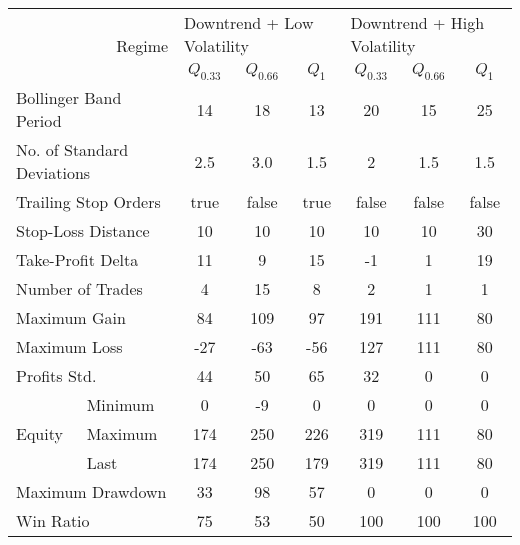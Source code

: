 \centering
\begin{tabular}{ll|cccccc}
    \toprule
    \multicolumn{2}{r|}{\multirow{2}{*}{Regime}} & \multicolumn{3}{l}{Downtrend + Low Volatility}   & \multicolumn{3}{l}{Downtrend + High Volatility}   \\
    \multicolumn{2}{r|}{} & $Q_{0.33}$ & $Q_{0.66}$ & $Q_{1}$ & $Q_{0.33}$ & $Q_{0.66}$ & $Q_{1}$ \\
    \midrule
    \multicolumn{2}{l|}{Bollinger Band Period} & 14 & 18 & 13 & 20 & 15 & 25 \\
    \multicolumn{2}{l|}{No. of Standard Deviations} & 2.5 & 3.0 & 1.5 & 2 & 1.5 & 1.5 \\
    \multicolumn{2}{l|}{Trailing Stop Orders} & true & false & true & false & false & false \\
    \multicolumn{2}{l|}{Stop-Loss Distance} & 10 & 10 & 10 & 10 & 10 & 30 \\
    \multicolumn{2}{l|}{Take-Profit Delta} & 11 & 9 & 15 & -1 & 1 & 19 \\
    \midrule
    \multicolumn{2}{l|}{Number of Trades} & 4 & 15 & 8 & 2 & 1 & 1 \\
    \multicolumn{2}{l|}{Maximum Gain} & 84 & 109 & 97 & 191 & 111 & 80 \\
    \multicolumn{2}{l|}{Maximum Loss} & -27 & -63 & -56 & 127 & 111 & 80 \\
    \multicolumn{2}{l|}{Profits Std.} & 44 & 50 & 65 & 32 & 0 & 0 \\
    \multirow{3}{*}{Equity} & Minimum & 0   & -9  & 0   & 0   & 0   & 0  \\
    & Maximum & 174 & 250 & 226 & 319 & 111 & 80 \\
    & Last    & 174 & 250 & 179 & 319 & 111 & 80 \\
    \multicolumn{2}{l|}{Maximum Drawdown} & 33 & 98 & 57 & 0 & 0 & 0 \\
    \multicolumn{2}{l|}{Win Ratio} & 75 & 53 & 50 & 100 & 100 & 100 \\
    \bottomrule
\end{tabular}
